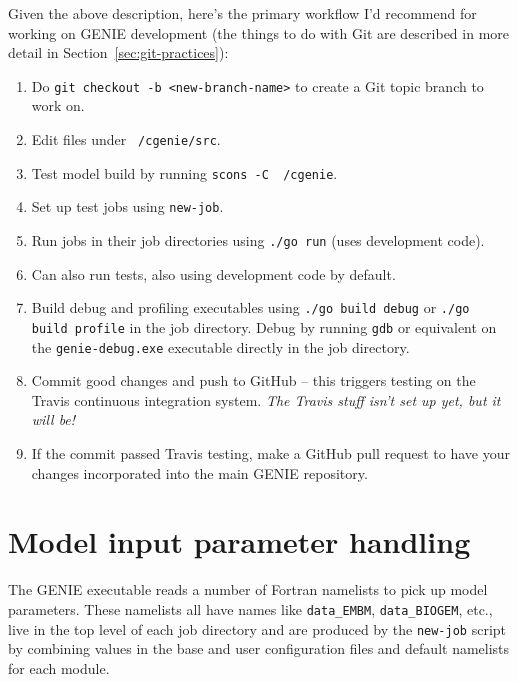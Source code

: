 \documentclass[a4paper,10pt,article]{memoir}
\begin{document}
Given the above description, here's the primary workflow I'd recommend
for working on GENIE development (the things to do with Git are
described in more detail in Section~\ref{sec:git-practices}):
\begin{enumerate}
  \item{Do \texttt{git checkout -b <new-branch-name>} to create a Git
    topic branch to work on.}
  \item{Edit files under \texttt{~/cgenie/src}.}
  \item{Test model build by running \texttt{scons -C ~/cgenie}.}
  \item{Set up test jobs using \texttt{new-job}.}
  \item{Run jobs in their job directories using \texttt{./go run}
    (uses development code).}
  \item{Can also run tests, also using development code by default.}
  \item{Build debug and profiling executables using \texttt{./go build
      debug} or \texttt{./go build profile} in the job directory.
    Debug by running \texttt{gdb} or equivalent on the
    \texttt{genie-debug.exe} executable directly in the job
    directory.}
  \item{Commit good changes and push to GitHub -- this triggers
    testing on the Travis continuous integration system.  \emph{The
      Travis stuff isn't set up yet, but it will be!}}
  \item{If the commit passed Travis testing, make a GitHub pull
    request to have your changes incorporated into the main GENIE
    repository.}
\end{enumerate}

\section{Model input parameter handling}

The GENIE executable reads a number of Fortran namelists to pick up
model parameters.  These namelists all have names like
\texttt{data\_EMBM}, \texttt{data\_BIOGEM}, etc., live in the top
level of each job directory and are produced by the \texttt{new-job}
script by combining values in the base and user configuration files
and default namelists for each module.
\end{document}
